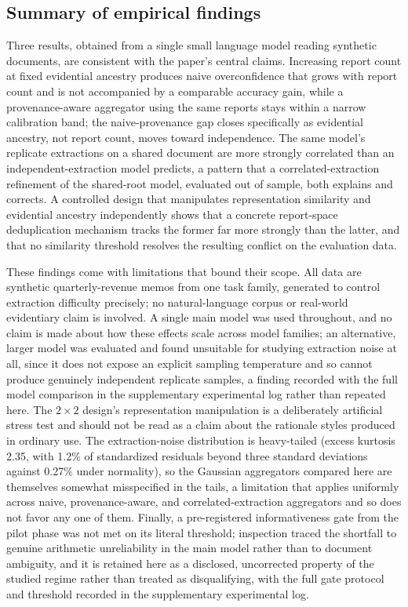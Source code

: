 \subsection{Summary of empirical findings}
\label{sec:emp-summary}

Three results, obtained from a single small language model reading
synthetic documents, are consistent with the paper's central claims.
Increasing report count at fixed evidential ancestry produces naive
overconfidence that grows with report count and is not accompanied by a
comparable accuracy gain, while a provenance-aware aggregator using the
same reports stays within a narrow calibration band; the naive-provenance
gap closes specifically as evidential ancestry, not report count, moves
toward independence. The same model's replicate extractions on a shared
document are more strongly correlated than an independent-extraction model
predicts, a pattern that a correlated-extraction refinement of the
shared-root model, evaluated out of sample, both explains and corrects. A
controlled design that manipulates representation similarity and
evidential ancestry independently shows that a concrete report-space
deduplication mechanism tracks the former far more strongly than the
latter, and that no similarity threshold resolves the resulting conflict
on the evaluation data.

These findings come with limitations that bound their scope. All data are
synthetic quarterly-revenue memos from one task family, generated to
control extraction difficulty precisely; no natural-language corpus or
real-world evidentiary claim is involved. A single main model was used
throughout, and no claim is made about how these effects scale across
model families; an alternative, larger model was evaluated and found
unsuitable for studying extraction noise at all, since it does not expose
an explicit sampling temperature and so cannot produce genuinely
independent replicate samples, a finding recorded with the full model
comparison in the supplementary experimental log rather than repeated
here. The $2\times2$ design's representation manipulation is a
deliberately artificial stress test and should not be read as a claim
about the rationale styles produced in ordinary use. The extraction-noise
distribution is heavy-tailed (excess kurtosis 2.35, with 1.2\% of
standardized residuals beyond three standard deviations against 0.27\%
under normality), so the Gaussian aggregators compared here are themselves
somewhat misspecified in the tails, a limitation that applies uniformly
across naive, provenance-aware, and correlated-extraction aggregators and
so does not favor any one of them. Finally, a pre-registered
informativeness gate from the pilot phase was not met on its literal
threshold; inspection traced the shortfall to genuine arithmetic
unreliability in the main model rather than to document ambiguity, and it
is retained here as a disclosed, uncorrected property of the studied
regime rather than treated as disqualifying, with the full gate protocol
and threshold recorded in the supplementary experimental log.

